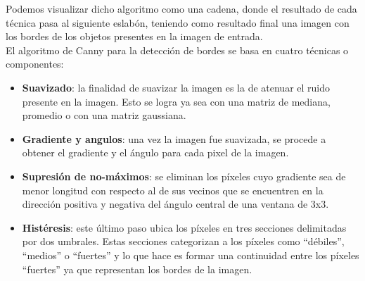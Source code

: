 \documentclass[conference]{IEEEtran}
\begin{document}
Podemos visualizar dicho algoritmo como una cadena, donde el resultado de cada t\'ecnica pasa al siguiente eslab\'on, teniendo como resultado final una imagen con los bordes de los objetos presentes en la imagen de entrada.\\

El algoritmo de Canny para la detecci\'on de bordes se basa en cuatro t\'ecnicas o componentes:\\
\begin{itemize}
	\item \textbf{Suavizado}: la finalidad de suavizar la imagen es la de atenuar el ruido presente en la imagen. Esto se logra ya sea con una matriz de mediana, promedio o con una matriz gaussiana.\\
	\item \textbf{Gradiente y angulos}: una vez la imagen fue suavizada, se procede a obtener el gradiente y el \'angulo para cada pixel de la imagen.\\
	\item \textbf{Supresi\'on de no-m\'aximos}: se eliminan los p\'ixeles cuyo gradiente sea de menor longitud con respecto al de sus vecinos que se encuentren en la direcci\'on positiva y negativa del \'angulo central de una ventana de 3x3.\\
	\item \textbf{Hist\'eresis}: este \'ultimo paso ubica los p\'ixeles en tres secciones delimitadas por dos umbrales. Estas secciones categorizan a los p\'ixeles como ``d\'ebiles'',  ``medios'' o ``fuertes'' y lo que hace es formar una continuidad entre los p\'ixeles ``fuertes'' ya que representan los bordes de la imagen.\\
\end{itemize}
\end{document}
